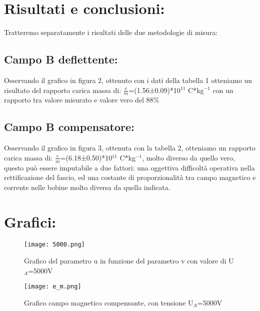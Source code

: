 \documentclass{article}
\begin{document}
\section{Risultati e conclusioni:}
Tratteremo separatamente i risultati delle due metodologie di misura:
\subsection{Campo \textbf{B} deflettente:}
Osservando il grafico in figura 2, ottenuto con i dati della tabella  1 otteniamo un risultato del rapporto carica massa di:
$\frac{e}{m}$=(1.56±0.09)*10$^{11}$ C*kg$^{-1}$ con un rapporto tra valore misurato e valore vero del 88$\%$
\subsection{Campo \textbf{B} compensatore:}
Osservando il grafico in figura 3, ottenuta con la tabella 2, otteniamo un rapporto carica massa di: $\frac{e}{m}$=(6.18±0.50)*10$^{11}$ C*kg$^{-1}$, molto diverso da quello vero, questo può essere imputabile a due fattori: una oggettiva difficoltà operativa nella rettificazione del fascio, ed una costante di proporzionalità tra campo magnetico e corrente nelle bobine molto diversa da quella indicata.
~
\section{Grafici:}
\begin{figure}[h!]
    \texttt{[image: 5000.png]} 
    \caption{Grafico del parametro u in funzione del parametro v con valore di U$_{A}$=5000V}
    \label{figura1}
\end{figure}
\begin{figure}[h!]
    \texttt{[image: e\_m.png]} 
    \caption{Grafico campo magnetico compensante, con tensione U$_{A}$=5000V}
    \label{figura1}
\end{figure}
\end{document}
